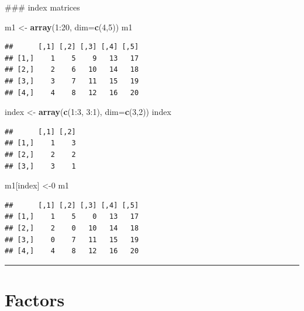 \documentclass[]{book}
\newenvironment{Shaded}{\begin{snugshade}}{\end{snugshade}}
\newcommand{\KeywordTok}[1]{\textcolor[rgb]{0.13,0.29,0.53}{\textbf{{#1}}}}
\newcommand{\DataTypeTok}[1]{\textcolor[rgb]{0.13,0.29,0.53}{{#1}}}
\newcommand{\DecValTok}[1]{\textcolor[rgb]{0.00,0.00,0.81}{{#1}}}
\newcommand{\StringTok}[1]{\textcolor[rgb]{0.31,0.60,0.02}{{#1}}}
\newcommand{\NormalTok}[1]{{#1}}
\begin{document}
\begin{Shaded}
\begin{Highlighting}[]
\NormalTok{### index matrices}

\NormalTok{m1 <-}\StringTok{ }\KeywordTok{array}\NormalTok{(}\DecValTok{1}\NormalTok{:}\DecValTok{20}\NormalTok{, }\DataTypeTok{dim=}\KeywordTok{c}\NormalTok{(}\DecValTok{4}\NormalTok{,}\DecValTok{5}\NormalTok{))}
\NormalTok{m1}
\end{Highlighting}
\end{Shaded}

\begin{verbatim}
##      [,1] [,2] [,3] [,4] [,5]
## [1,]    1    5    9   13   17
## [2,]    2    6   10   14   18
## [3,]    3    7   11   15   19
## [4,]    4    8   12   16   20
\end{verbatim}

\begin{Shaded}
\begin{Highlighting}[]
\NormalTok{index <-}\StringTok{ }\KeywordTok{array}\NormalTok{(}\KeywordTok{c}\NormalTok{(}\DecValTok{1}\NormalTok{:}\DecValTok{3}\NormalTok{, }\DecValTok{3}\NormalTok{:}\DecValTok{1}\NormalTok{), }\DataTypeTok{dim=}\KeywordTok{c}\NormalTok{(}\DecValTok{3}\NormalTok{,}\DecValTok{2}\NormalTok{))}
\NormalTok{index}
\end{Highlighting}
\end{Shaded}

\begin{verbatim}
##      [,1] [,2]
## [1,]    1    3
## [2,]    2    2
## [3,]    3    1
\end{verbatim}

\begin{Shaded}
\begin{Highlighting}[]
\NormalTok{m1[index] <-}\DecValTok{0}
\NormalTok{m1}
\end{Highlighting}
\end{Shaded}

\begin{verbatim}
##      [,1] [,2] [,3] [,4] [,5]
## [1,]    1    5    0   13   17
## [2,]    2    0   10   14   18
## [3,]    0    7   11   15   19
## [4,]    4    8   12   16   20
\end{verbatim}

\begin{center}\rule{0.5\linewidth}{\linethickness}\end{center}

\section{Factors}\label{factors}
\end{document}
